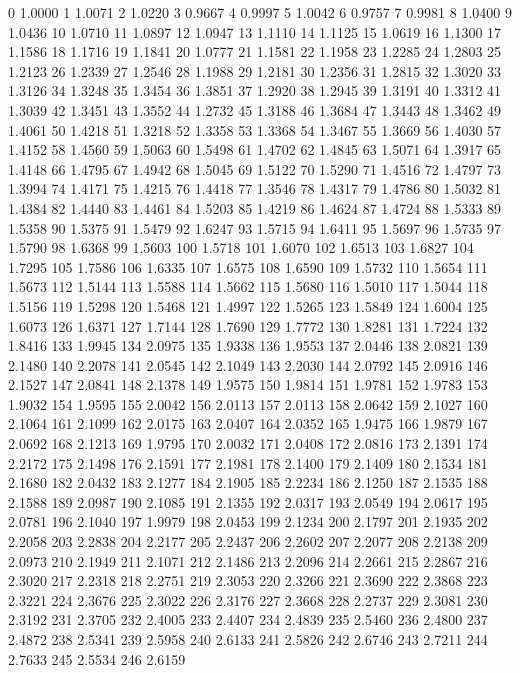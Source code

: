 0 1.0000
1 1.0071
2 1.0220
3 0.9667
4 0.9997
5 1.0042
6 0.9757
7 0.9981
8 1.0400
9 1.0436
10 1.0710
11 1.0897
12 1.0947
13 1.1110
14 1.1125
15 1.0619
16 1.1300
17 1.1586
18 1.1716
19 1.1841
20 1.0777
21 1.1581
22 1.1958
23 1.2285
24 1.2803
25 1.2123
26 1.2339
27 1.2546
28 1.1988
29 1.2181
30 1.2356
31 1.2815
32 1.3020
33 1.3126
34 1.3248
35 1.3454
36 1.3851
37 1.2920
38 1.2945
39 1.3191
40 1.3312
41 1.3039
42 1.3451
43 1.3552
44 1.2732
45 1.3188
46 1.3684
47 1.3443
48 1.3462
49 1.4061
50 1.4218
51 1.3218
52 1.3358
53 1.3368
54 1.3467
55 1.3669
56 1.4030
57 1.4152
58 1.4560
59 1.5063
60 1.5498
61 1.4702
62 1.4845
63 1.5071
64 1.3917
65 1.4148
66 1.4795
67 1.4942
68 1.5045
69 1.5122
70 1.5290
71 1.4516
72 1.4797
73 1.3994
74 1.4171
75 1.4215
76 1.4418
77 1.3546
78 1.4317
79 1.4786
80 1.5032
81 1.4384
82 1.4440
83 1.4461
84 1.5203
85 1.4219
86 1.4624
87 1.4724
88 1.5333
89 1.5358
90 1.5375
91 1.5479
92 1.6247
93 1.5715
94 1.6411
95 1.5697
96 1.5735
97 1.5790
98 1.6368
99 1.5603
100 1.5718
101 1.6070
102 1.6513
103 1.6827
104 1.7295
105 1.7586
106 1.6335
107 1.6575
108 1.6590
109 1.5732
110 1.5654
111 1.5673
112 1.5144
113 1.5588
114 1.5662
115 1.5680
116 1.5010
117 1.5044
118 1.5156
119 1.5298
120 1.5468
121 1.4997
122 1.5265
123 1.5849
124 1.6004
125 1.6073
126 1.6371
127 1.7144
128 1.7690
129 1.7772
130 1.8281
131 1.7224
132 1.8416
133 1.9945
134 2.0975
135 1.9338
136 1.9553
137 2.0446
138 2.0821
139 2.1480
140 2.2078
141 2.0545
142 2.1049
143 2.2030
144 2.0792
145 2.0916
146 2.1527
147 2.0841
148 2.1378
149 1.9575
150 1.9814
151 1.9781
152 1.9783
153 1.9032
154 1.9595
155 2.0042
156 2.0113
157 2.0113
158 2.0642
159 2.1027
160 2.1064
161 2.1099
162 2.0175
163 2.0407
164 2.0352
165 1.9475
166 1.9879
167 2.0692
168 2.1213
169 1.9795
170 2.0032
171 2.0408
172 2.0816
173 2.1391
174 2.2172
175 2.1498
176 2.1591
177 2.1981
178 2.1400
179 2.1409
180 2.1534
181 2.1680
182 2.0432
183 2.1277
184 2.1905
185 2.2234
186 2.1250
187 2.1535
188 2.1588
189 2.0987
190 2.1085
191 2.1355
192 2.0317
193 2.0549
194 2.0617
195 2.0781
196 2.1040
197 1.9979
198 2.0453
199 2.1234
200 2.1797
201 2.1935
202 2.2058
203 2.2838
204 2.2177
205 2.2437
206 2.2602
207 2.2077
208 2.2138
209 2.0973
210 2.1949
211 2.1071
212 2.1486
213 2.2096
214 2.2661
215 2.2867
216 2.3020
217 2.2318
218 2.2751
219 2.3053
220 2.3266
221 2.3690
222 2.3868
223 2.3221
224 2.3676
225 2.3022
226 2.3176
227 2.3668
228 2.2737
229 2.3081
230 2.3192
231 2.3705
232 2.4005
233 2.4407
234 2.4839
235 2.5460
236 2.4800
237 2.4872
238 2.5341
239 2.5958
240 2.6133
241 2.5826
242 2.6746
243 2.7211
244 2.7633
245 2.5534
246 2.6159
